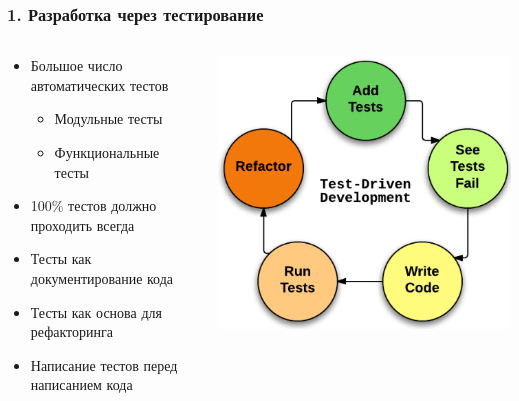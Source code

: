 \documentclass{../../slides-style}
\begin{document}
    \begin{frame}
        \frametitle{1. Разработка через тестирование}
        \begin{columns}
            \begin{column}{0.7\textwidth}
                \begin{itemize}
                    \item Большое число автоматических тестов
                    \begin{itemize}
                        \item Модульные тесты
                        \item Функциональные тесты
                    \end{itemize}
                    \item 100\% тестов должно проходить всегда
                    \item Тесты как документирование кода
                    \item Тесты как основа для рефакторинга
                    \item Написание тестов перед написанием кода
                \end{itemize}
            \end{column}
            \begin{column}{0.3\textwidth}
                \begin{center}
                    \includegraphics[width=\textwidth]{tddLoop.png}
                \end{center}
            \end{column}
        \end{columns}
    \end{frame}
\end{document}
